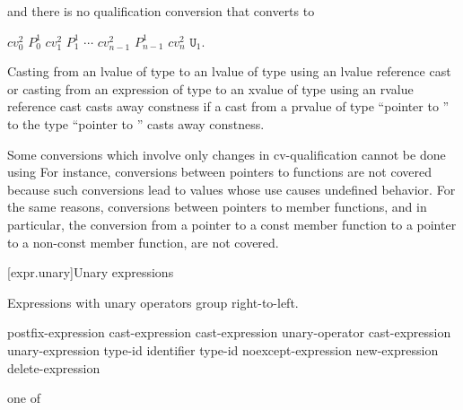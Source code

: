 and there is no qualification conversion that converts  to

\begin{indented}
$cv_0^2$ $P_0^1$ $cv_1^2$ $P_1^1$ $\cdots$ $cv_{n-1}^2$ $P_{n-1}^1$ $cv_n^2$ $\mathtt{U}_1$.
\end{indented}

\pnum
Casting from an lvalue of type  to an lvalue of type
 using an lvalue reference cast
or casting from an expression of type  to an xvalue of type  using
an rvalue reference cast
casts away constness if a cast from a prvalue of type ``pointer to '' to the type ``pointer to
'' casts away constness.

\pnum
\begin{note}
Some conversions which involve only changes in cv-qualification cannot
be done using  For instance, conversions between
pointers to functions are not covered because such conversions lead to
values whose use causes undefined behavior. For the same reasons,
conversions between pointers to member functions, and in particular, the
conversion from a pointer to a const member function to a pointer to a
non-const member function, are not covered.
\end{note}%

[expr.unary]{Unary expressions}

\pnum
{}%
Expressions with unary operators group right-to-left.

%
%
%
%
%
\begin{bnf}
\br
    postfix-expression\br
    \terminal{++} cast-expression\br
    \terminal{-{-}} cast-expression\br
    unary-operator cast-expression\br
     unary-expression\br
     type-id \terminal{)}\br
     \terminal{(} identifier \terminal{)}\br
     type-id \terminal{)}\br
    noexcept-expression\br
    new-expression\br
    delete-expression
\end{bnf}

%
%
%
%
%
%
%
%
%
%
%
%
%
%
%
\begin{bnf}
 \textnormal{one of}\br
    \terminal{*  \&  +  -  !  \~}
\end{bnf}

